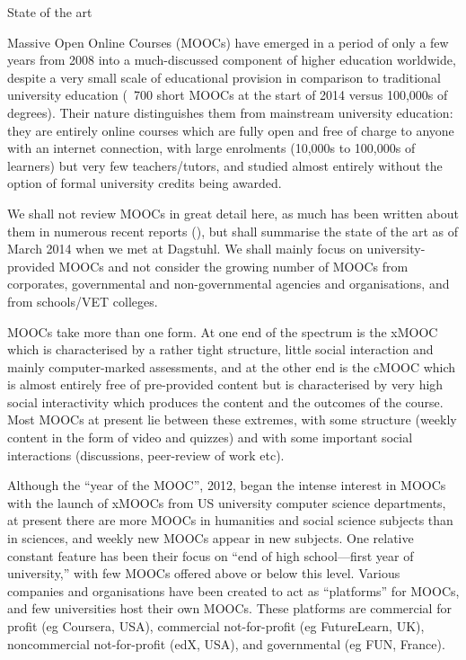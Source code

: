 State of the art

Massive Open Online Courses (MOOCs) have emerged in a period of only a
few years from 2008 into a much-discussed component of higher education
worldwide, despite a very small scale of educational provision in
comparison to traditional university education (~700 short MOOCs at the
start of 2014 versus 100,000s of degrees).  Their nature distinguishes
them from mainstream university education: they are entirely online
courses which are fully open and free of charge to anyone with an
internet connection, with large enrolments (10,000s to 100,000s of
learners) but very few teachers/tutors, and studied almost entirely
without the option of formal university credits being awarded.

We shall not review MOOCs in great detail here, as much has been written
about them in numerous recent reports (), but shall summarise the state of
the art as of March 2014 when we met at Dagstuhl.
We shall mainly focus on university-provided MOOCs and not consider
the growing number of MOOCs from corporates, governmental and
non-governmental agencies and organisations, and from schools/VET
colleges.


MOOCs take more than one form.  At one end of the spectrum is the xMOOC
which is characterised by a rather tight structure, little social
interaction and mainly computer-marked assessments, and at the other end
is the cMOOC which is almost entirely free of pre-provided content but
is characterised by very high social interactivity which produces the
content and the outcomes of the course.  Most MOOCs at present lie
between these extremes, with some structure (weekly content in the form
of video and quizzes) and with some important social interactions
(discussions, peer-review of work etc).

Although the ``year of the MOOC'', 2012, began the intense interest in
MOOCs with the launch of xMOOCs from US university computer science
departments, at present there are more MOOCs in humanities and social
science subjects than in sciences, and weekly new MOOCs appear in new
subjects.  One relative constant feature has been their focus on ``end of
high school---first year of university,'' with few MOOCs offered above or
below this level.  Various companies and organisations have been created
to act as   ``platforms'' for MOOCs, and few universities host their own
MOOCs. These platforms are commercial for profit (eg Coursera, USA),
commercial not-for-profit (eg FutureLearn, UK), noncommercial
not-for-profit (edX, USA), and governmental (eg FUN, France).

